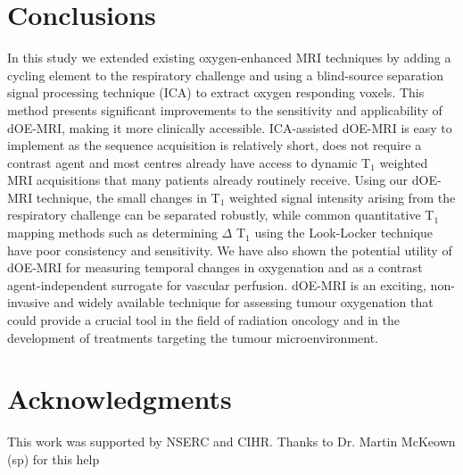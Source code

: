 \section{Conclusions}

In this study we extended existing oxygen-enhanced MRI techniques by adding a cycling element to the respiratory challenge and using a blind-source separation signal processing technique (ICA) to extract oxygen responding voxels.
This method presents significant improvements to the sensitivity and applicability of dOE-MRI, making it more clinically accessible.
ICA-assisted dOE-MRI is easy to implement as the sequence acquisition is relatively short, does not require a contrast agent and most centres already have access to dynamic T$_1$ weighted MRI acquisitions that many patients already routinely receive.
Using our dOE-MRI technique, the small changes in T$_1$ weighted signal intensity arising from the respiratory challenge can be separated robustly, while common quantitative T$_1$ mapping methods such as determining $\Delta$ T$_1$ using the Look-Locker technique have poor consistency and sensitivity.
We have also shown the potential utility of dOE-MRI for measuring temporal changes in oxygenation and as a contrast agent-independent surrogate for vascular perfusion.
dOE-MRI is an exciting, non-invasive and widely available technique for assessing tumour oxygenation that could provide a crucial tool in the field of radiation oncology and in the development of treatments targeting the tumour microenvironment.
  

\section{Acknowledgments}

This work was supported by NSERC and CIHR.
Thanks to Dr.
Martin McKeown (sp) for this help


\endinput

Any text after an \endinput is ignored.
You could put scraps here or things in progress.
